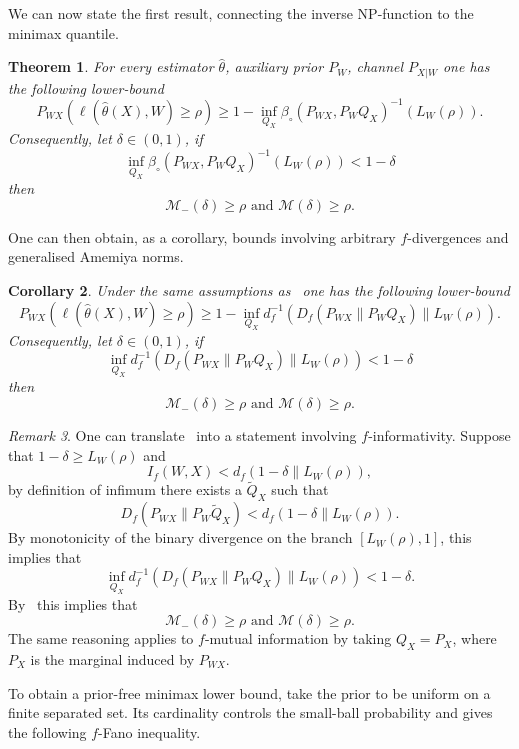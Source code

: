 \documentclass[11pt]{article}
\newtheorem{theorem}{Theorem}[section]
\newtheorem{corollary}[theorem]{Corollary}
\theoremstyle{definition}
\theoremstyle{remark}
\newtheorem{remark}[theorem]{Remark}
\newcommand{\1}{\boldsymbol{1}}
\begin{document}
We can now state the first result, connecting the inverse NP-function to the minimax quantile.
\begin{theorem}\label{thm:npLowerBound}
    For every estimator $\widehat \theta$, auxiliary prior $P_W$, channel $P_{X|W}$ one has the following lower-bound 
    \begin{equation}
          P_{WX}(\ell(\widehat \theta(X),W)\geq \rho) \geq 1-\inf_{Q_X}\beta_{\circ}(P_{WX},P_WQ_X)^{-1}(L_W(\rho)).
    \end{equation}
    Consequently, let \(\delta \in (0,1)\), if \[\inf_{Q_X}\beta_{\circ}(P_{WX},P_WQ_X)^{-1}(L_W(\rho)) <1-\delta \] then
    \begin{equation}
        \mathcal M_{-}(\delta) \geq \rho \text{ and } \mathcal M(\delta) \geq \rho.
    \end{equation}
\end{theorem}
One can then obtain, as a corollary, bounds involving arbitrary
$f$-divergences and generalised Amemiya norms.
\begin{corollary}\label{thm:fDivLowerBound}
Under the same assumptions as~ one has the following lower-bound
\begin{equation}
      P_{WX}(\ell(\widehat \theta(X),W)\geq \rho) \geq 1-\inf_{Q_X}d_{f}^{-1}(D_f(P_{WX}\|P_WQ_X)\|L_W(\rho)).
\end{equation}
  Consequently, let \(\delta \in (0,1)\), if \[\inf_{Q_X}d_{f}^{-1}(D_f(P_{WX}\|P_WQ_X)\|L_W(\rho)) <1-\delta \] then
    \begin{equation}
        \mathcal M_{-}(\delta) \geq \rho \text{ and } \mathcal M(\delta) \geq \rho.
    \end{equation}
\end{corollary}
\begin{remark}
    One can translate~ into a statement involving
    $f$-informativity.  Suppose that $1-\delta\geq L_W(\rho)$ and
    \[ I_f(W,X) < d_f(1-\delta\|L_W(\rho)),\] by definition of infimum there exists a $\tilde Q_X$ such that
    \[
    D_f(P_{WX}\|P_W \tilde{Q}_X) < d_f(1-\delta\|L_W(\rho)).
    \]
    By monotonicity of the binary divergence on the branch
    $[L_W(\rho),1]$, this implies that
    \begin{equation}
        \inf_{Q_X}d_{f}^{-1}(D_f(P_{WX}\|P_WQ_X)\|L_W(\rho)) <1-\delta.
    \end{equation}
    By~ this implies that
    \[
       \mathcal M_{-}(\delta) \geq \rho \text{ and } \mathcal M(\delta) \geq \rho.
    \]
    The same reasoning applies to \(f\)-mutual information by taking
    \(Q_X=P_X\), where \(P_X\) is the marginal induced by \(P_{WX}\).
\end{remark}
To obtain a prior-free minimax lower bound, take the prior to be uniform
on a finite separated set. Its cardinality controls the small-ball
probability and gives the following \(f\)-Fano inequality.
\end{document}
